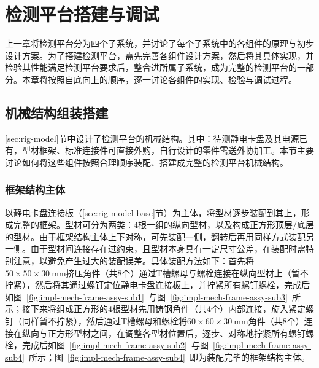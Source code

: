 \chapter{检测平台搭建与调试}\label{ch:impl}

上一章将检测平台分为四个子系统，并讨论了每个子系统中的各组件的原理与初步设计方案。为了搭建检测平台，需先完善各组件设计方案，然后将其具体实现，并检验其性能满足检测平台要求后，整合进所属子系统，成为完整的检测平台的一部分。本章将按照自底向上的顺序，逐一讨论各组件的实现、检验与调试过程。



\section{机械结构组装搭建}\label{sec:impl-mech}

\ref{sec:rig-model}节中设计了检测平台的机械结构。其中：待测静电卡盘及其电源已有，型材框架、标准连接件可直接外购，自行设计的零件需送外协加工。本节主要讨论如何将这些组件按照合理顺序装配、搭建成完整的检测平台机械结构。


\subsection{框架结构主体}\label{sec:impl-mech-frame}

以静电卡盘连接板（\ref{sec:rig-model-base}节）为主体，将型材逐步装配到其上，形成完整的框架。型材可分为两类：4根一组的纵向型材，以及构成正方形顶层/底层的型材。由于框架结构主体上下对称，可先装配一侧，翻转后再用同样方式装配另一侧。由于型材间连接存在过约束，且型材本身具有一定尺寸公差，在装配时需特别注意，以避免产生过大的装配误差。具体装配方法如下：首先将$\num{50}\times\num{50}\times\SI{30}{\mm}$挤压角件（共8个）通过T槽螺母与螺栓连接在纵向型材上（暂不拧紧），然后将其通过螺钉定位静电卡盘连接板上，并拧紧所有螺钉螺栓，完成后如图~\ref{fig:impl-mech-frame-assy-sub1}~与图~\ref{fig:impl-mech-frame-assy-sub3}~所示；接下来将组成正方形的4根型材先用铸钢角件（共4个）内部连接，旋入紧定螺钉（同样暂不拧紧），然后通过T槽螺母和螺栓将$\num{60}\times\num{60}\times\SI{30}{\mm}$角件（共8个）连接在纵向与正方形型材之间，在调整各型材位置后，逐步、对称地拧紧所有螺钉螺栓，完成后如图~\ref{fig:impl-mech-frame-assy-sub2}~与图~\ref{fig:impl-mech-frame-assy-sub4}~所示；图~\ref{fig:impl-mech-frame-assy-sub4}~即为装配完毕的框架结构主体。

